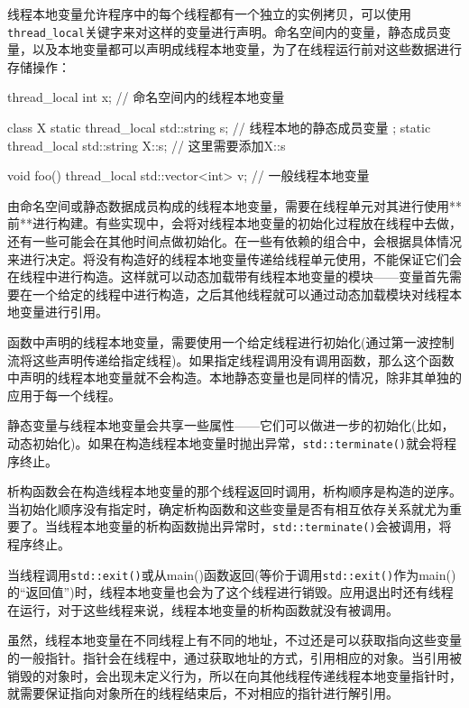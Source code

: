 
线程本地变量允许程序中的每个线程都有一个独立的实例拷贝，可以使用\texttt{thread\_local}关键字来对这样的变量进行声明。命名空间内的变量，静态成员变量，以及本地变量都可以声明成线程本地变量，为了在线程运行前对这些数据进行存储操作：

\begin{cpp}
thread_local int x;  // 命名空间内的线程本地变量

class X
{
  static thread_local std::string s;  // 线程本地的静态成员变量
};
static thread_local std::string X::s;  // 这里需要添加X::s

void foo()
{
  thread_local std::vector<int> v;  // 一般线程本地变量
}
\end{cpp}

由命名空间或静态数据成员构成的线程本地变量，需要在线程单元对其进行使用**前**进行构建。有些实现中，会将对线程本地变量的初始化过程放在线程中去做，还有一些可能会在其他时间点做初始化。在一些有依赖的组合中，会根据具体情况来进行决定。将没有构造好的线程本地变量传递给线程单元使用，不能保证它们会在线程中进行构造。这样就可以动态加载带有线程本地变量的模块——变量首先需要在一个给定的线程中进行构造，之后其他线程就可以通过动态加载模块对线程本地变量进行引用。

函数中声明的线程本地变量，需要使用一个给定线程进行初始化(通过第一波控制流将这些声明传递给指定线程)。如果指定线程调用没有调用函数，那么这个函数中声明的线程本地变量就不会构造。本地静态变量也是同样的情况，除非其单独的应用于每一个线程。

静态变量与线程本地变量会共享一些属性——它们可以做进一步的初始化(比如，动态初始化)。如果在构造线程本地变量时抛出异常，\texttt{std::terminate()}就会将程序终止。

析构函数会在构造线程本地变量的那个线程返回时调用，析构顺序是构造的逆序。当初始化顺序没有指定时，确定析构函数和这些变量是否有相互依存关系就尤为重要了。当线程本地变量的析构函数抛出异常时，\texttt{std::terminate()}会被调用，将程序终止。

当线程调用\texttt{std::exit()}或从main()函数返回(等价于调用\texttt{std::exit()}作为main()的“返回值”)时，线程本地变量也会为了这个线程进行销毁。应用退出时还有线程在运行，对于这些线程来说，线程本地变量的析构函数就没有被调用。

虽然，线程本地变量在不同线程上有不同的地址，不过还是可以获取指向这些变量的一般指针。指针会在线程中，通过获取地址的方式，引用相应的对象。当引用被销毁的对象时，会出现未定义行为，所以在向其他线程传递线程本地变量指针时，就需要保证指向对象所在的线程结束后，不对相应的指针进行解引用。